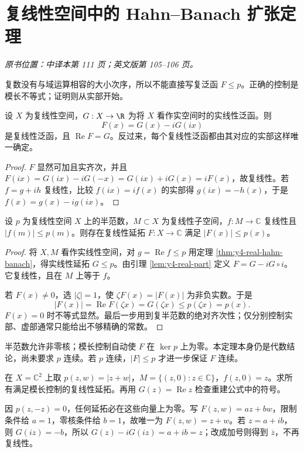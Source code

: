 \section{复线性空间中的 Hahn--Banach 扩张定理}\label{sec:yosida-04-04}
\noindent\textit{原书位置：中译本第 111 页；英文版第 105--106 页。}

复数没有与域运算相容的大小次序，所以不能直接写复泛函 $F\le p$。正确的控制是模长不等式；证明则从实部开始。

\begin{lemma}[由实部重建复线性泛函]\label{lem:y4-real-part}
设 $X$ 为复线性空间，$G:X\to\R$ 为将 $X$ 看作实空间时的实线性泛函。则
\[
 F(x)=G(x)-iG(ix)
\]
是复线性泛函，且 $\operatorname{Re}F=G$。反过来，每个复线性泛函都由其对应的实部这样唯一确定。
\end{lemma}
\begin{proof}
$F$ 显然可加且实齐次，并且
$F(ix)=G(ix)-iG(-x)=G(ix)+iG(x)=iF(x)$，故复线性。若 $f=g+ih$ 复线性，比较 $f(ix)=if(x)$ 的实部得 $g(ix)=-h(x)$，于是 $f(x)=g(x)-ig(ix)$。
\end{proof}

\begin{theorem}\label{thm:y4-complex-hahn-banach}
设 $p$ 为复线性空间 $X$ 上的半范数，$M\subset X$ 为复线性子空间，$f:M\to\mathbb C$ 复线性且 $|f(m)|\le p(m)$。则存在复线性延拓 $F:X\to\mathbb C$ 满足 $|F(x)|\le p(x)$。
\end{theorem}
\begin{proof}
将 $X,M$ 看作实线性空间，对 $g=\operatorname{Re}f\le p$ 用定理 \ref{thm:y4-real-hahn-banach}，得实线性延拓 $G\le p$。由引理 \ref{lem:y4-real-part} 定义 $F=G-iG\circ i$。它复线性，且在 $M$ 上等于 $f$。

若 $F(x)\ne0$，选 $|\zeta|=1$，使 $\zeta F(x)=|F(x)|$ 为非负实数。于是
\[
 |F(x)|=\operatorname{Re}F(\zeta x)=G(\zeta x)
 \le p(\zeta x)=p(x).
\]
$F(x)=0$ 时不等式显然。最后一步用到复半范数的绝对齐次性；仅分别控制实部、虚部通常只能给出不够精确的常数。
\end{proof}

半范数允许非零核；模长控制自动使 $F$ 在 $\ker p$ 上为零。本定理本身仍是代数结论，尚未要求 $p$ 连续。若 $p$ 连续，$|F|\le p$ 才进一步保证 $F$ 连续。

\begin{exercise}
在 $X=\mathbb C^2$ 上取 $p(z,w)=|z+w|$，$M=\{(z,0):z\in\mathbb C\}$，$f(z,0)=z$。求所有满足模长控制的复线性延拓。再用 $G(z)=\operatorname{Re}z$ 检查重建公式中的符号。
\end{exercise}
\begin{solution}
因 $p(z,-z)=0$，任何延拓必在这些向量上为零。写 $F(z,w)=az+bw$，限制条件给 $a=1$，零核条件给 $b=1$，故唯一为 $F(z,w)=z+w$。若 $z=a+ib$，则 $G(iz)=-b$，所以 $G(z)-iG(iz)=a+ib=z$；改成加号则得到 $\overline z$，不再复线性。
\end{solution}
